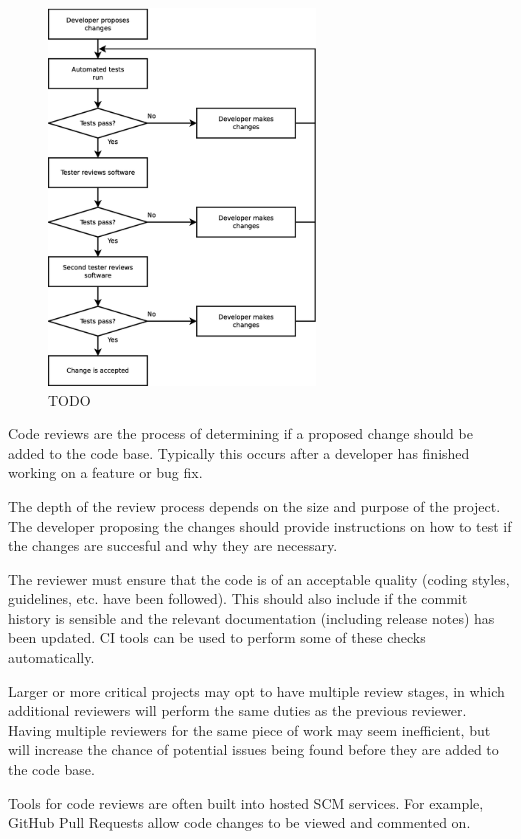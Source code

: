 \documentclass[jnr]{iosart2x}
\begin{document}
\begin{figure}
    \centering
    \includegraphics[height=10cm]{code_review_process.eps}
    \caption{TODO}
    \label{Code_Review_Process}
\end{figure}

Code reviews  are the process of determining if a proposed change should be added to the code base. Typically this occurs after a developer has finished working on a feature or bug fix.

The depth of the review process depends on the size and purpose of the project.
The developer proposing the changes should provide instructions on how to test if the changes are succesful and why they are necessary.

The reviewer must ensure that the code is of an acceptable quality (coding styles, guidelines, etc. have been followed). 
This should also include if the commit history is sensible and the relevant documentation (including release notes) has been updated.
CI tools can be used to perform some of these checks automatically.

Larger or more critical projects may opt to have multiple review stages, in which additional reviewers will perform the same duties as the previous reviewer.
Having multiple reviewers for the same piece of work may seem inefficient, but will increase the chance of potential issues being found before they are added to the code base.

Tools for code reviews are often built into hosted SCM services. For example, GitHub Pull Requests allow code changes to be viewed and commented on.
\end{document}
